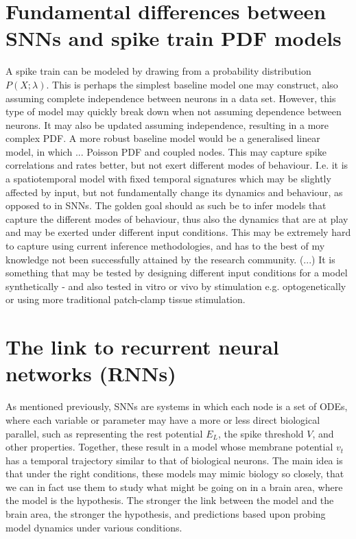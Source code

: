 \documentclass[mphil,deptreport,ai]{infthesis} %
\begin{document}
\section{Fundamental differences between SNNs and spike train PDF models}

A spike train can be modeled by drawing from a probability distribution $P(X; \lambda)$.
This is perhaps the simplest baseline model one may construct, also assuming complete independence between neurons in a data set.
However, this type of model may quickly break down when not assuming dependence between neurons.
It may also be updated assuming independence, resulting in a more complex PDF.
A more robust baseline model would be a generalised linear model, in which ... Poisson PDF and coupled nodes.
This may capture spike correlations and rates better, but not exert different modes of behaviour.
I.e. it is a spatiotemporal model with fixed temporal signatures which may be slightly affected by input, but not fundamentally change its dynamics and behaviour, as opposed to in SNNs.
The golden goal should as such be to infer models that capture the different modes of behaviour, thus also the dynamics that are at play and may be exerted under different input conditions.
This may be extremely hard to capture using current inference methodologies, and has to the best of my knowledge not been successfully attained by the research community.
(...)
It is something that may be tested by designing different input conditions for a model synthetically - and also tested in vitro or vivo by stimulation e.g. optogenetically or using more traditional patch-clamp tissue stimulation.

\section{The link to recurrent neural networks (RNNs)}

As mentioned previously, SNNs are systems in which each node is a set of ODEs, where each variable or parameter may have a more or less direct biological parallel, such as representing the rest potential $E_L$, the spike threshold $V$, and other properties.
Together, these result in a model whose membrane potential $v_t$ has a temporal trajectory similar to that of biological neurons.
The main idea is that under the right conditions, these models may mimic biology so closely, that we can in fact use them to study what might be going on in a brain area, where the model is the hypothesis.
The stronger the link between the model and the brain area, the stronger the hypothesis, and predictions based upon probing model dynamics under various conditions.
\end{document}
